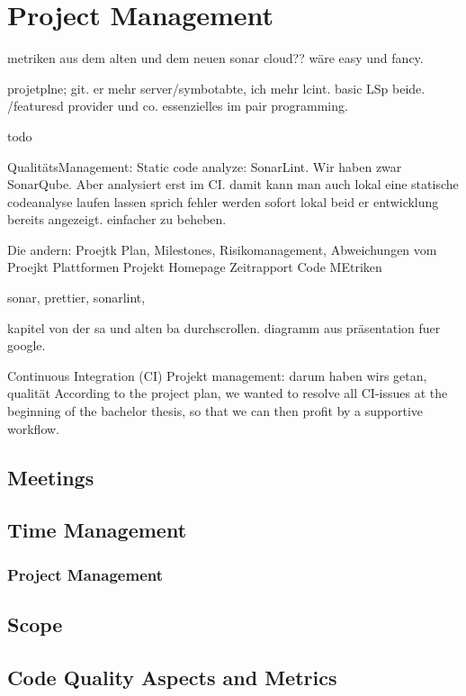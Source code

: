 \section{Project Management}
\label{section:project_management}


metriken aus dem alten und dem neuen sonar cloud?? wäre easy und fancy.


projetplne; git. er mehr server/symbotabte, ich mehr lcint.
basic LSp beide. /featuresd provider und co. essenzielles im pair programming. 

todo

QualitätsManagement: Static code analyze: SonarLint. \cite{sonar-lint}
Wir haben zwar SonarQube. Aber analysiert erst im CI.
damit kann man auch lokal eine statische codeanalyse laufen lassen sprich fehler werden sofort lokal beid er
entwicklung bereits angezeigt. einfacher zu beheben.


Die andern:
Proejtk Plan, Milestones, Risikomanagement, Abweichungen vom Proejkt Plattformen
Projekt Homepage
Zeitrapport
Code MEtriken



sonar, prettier, sonarlint,

kapitel von der sa und alten ba durchscrollen.
diagramm aus präsentation fuer google.

Continuous Integration (CI)
Projekt management: darum haben wirs getan, qualität
According to the project plan, we wanted to resolve all CI-issues at the beginning of the bachelor thesis, so that we can then profit by a supportive workflow.




\subsection{Meetings}

\subsection{Time Management}
\subsubsection{Project Management}

\subsection{Scope}

\subsection{Code Quality Aspects and Metrics}


